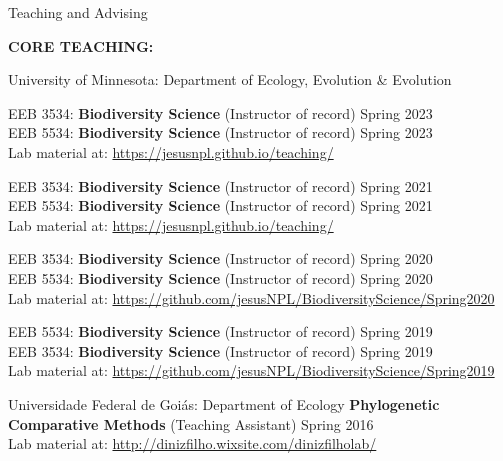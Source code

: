 \documentclass{resume} %
\begin{document}


\begin{rSection}{Teaching and Advising}

\textbf{CORE TEACHING:}

\normalfont 

\begin{reSubsection}{University of Minnesota: }{Department of Ecology, Evolution \& Evolution }{}{
EEB 3534: \textbf{Biodiversity Science} (Instructor of record) \hfill Spring 2023 \\ 
EEB 5534: \textbf{Biodiversity Science} (Instructor of record) \hfill Spring 2023 \\ 
{Lab material at:
\url{https://jesusnpl.github.io/teaching/}} \smallskip

EEB 3534: \textbf{Biodiversity Science} (Instructor of record) \hfill Spring 2021 \\ 
EEB 5534: \textbf{Biodiversity Science} (Instructor of record) \hfill Spring 2021 \\ 
{Lab material at:
\url{https://jesusnpl.github.io/teaching/}} \smallskip

EEB 3534: \textbf{Biodiversity Science} (Instructor of record) \hfill Spring 2020 \\ 
EEB 5534: \textbf{Biodiversity Science} (Instructor of record) \hfill Spring 2020 \\ 
{Lab material at:
\url{https://github.com/jesusNPL/BiodiversityScience/Spring2020}} \smallskip 

EEB 5534: \textbf{Biodiversity Science} (Instructor of record) \hfill Spring 2019 \\  
EEB 3534: \textbf{Biodiversity Science} (Instructor of record) \hfill Spring 2019 \\ 
{Lab material at:
\url{https://github.com/jesusNPL/BiodiversityScience/Spring2019}} \smallskip 
}
\end{reSubsection}

\begin{reSubsection}{Universidade Federal de Goiás: }{Department of Ecology }{}{
\textbf{Phylogenetic Comparative Methods} (Teaching Assistant) \hfill Spring 2016 \\ 
{Lab material at:
\url{http://dinizfilho.wixsite.com/dinizfilholab/}} \smallskip 
} 
\end{reSubsection}


\end{rSection}
\end{document}

